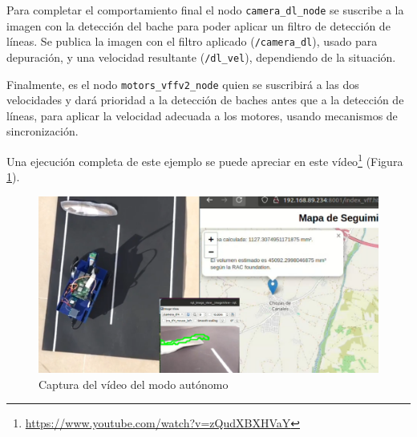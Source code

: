 Para completar el comportamiento final el nodo \verb|camera_dl_node| se suscribe a la imagen con la detección del bache para poder aplicar un filtro de detección de líneas. Se publica la imagen con el filtro aplicado (\verb|/camera_dl|), usado para depuración, y una velocidad resultante (\verb|/dl_vel|), dependiendo de la situación.

Finalmente, es el nodo \verb|motors_vffv2_node| quien se suscribirá a las dos velocidades y dará prioridad a la detección de baches antes que a la detección de líneas, para aplicar la velocidad adecuada a los motores, usando mecanismos de sincronización.

Una ejecución completa de este ejemplo se puede apreciar en este vídeo\footnote{\url{https://www.youtube.com/watch?v=zQudXBXHVaY}} (Figura \ref{fig:expvfffinal}). 

\begin{figure} [h!]
	\begin{center}
		\includegraphics[width=15cm]{figs/cap7/autonomo_final.png}
	\end{center}
	\caption{Captura del vídeo del modo autónomo}
	\label{fig:expvfffinal}
\end{figure}

